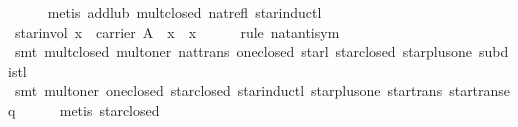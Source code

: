 \begin{isabellebody}
%
\isadelimproof
\ \ \ \ %
\endisadelimproof
%
\isatagproof
{}\isamarkupfalse%
\ {}metis\ add{}lub\ mult{}closed\ nat{}refl\ star{}inductl{}%
\endisatagproof
{\isafoldproof}%
%
\isadelimproof
\isanewline
%
\endisadelimproof
\isanewline
\ \ \isamarkupfalse%
\ star{}invol{}\ {}x\ {}\ carrier\ A\ {}\ x\ {}\ {}x\isanewline
%
\isadelimproof
\ \ \ \ %
\endisadelimproof
%
\isatagproof
{}\isamarkupfalse%
\ {}rule\ nat{}antisym{}\isanewline
\ \ \ \ \isamarkupfalse%
\ {}smt\ mult{}closed\ mult{}oner\ nat{}trans\ one{}closed\ star{}{}l\ star{}closed\ star{}plus{}one\ subdistl{}\isanewline
\ \ \ \ \isamarkupfalse%
\ {}smt\ mult{}oner\ one{}closed\ star{}closed\ star{}inductl\ star{}plus{}one\ star{}trans\ star{}trans{}eq{}\isanewline
\ \ \ \ \isamarkupfalse%
\ {}metis\ star{}closed{}{}\isanewline

\end{isabellebody}
